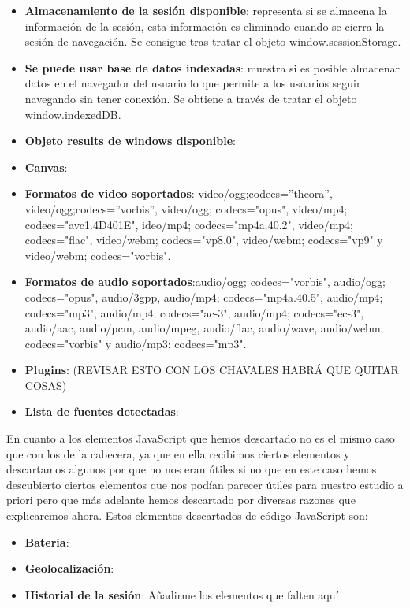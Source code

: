 \begin{itemize}
    \item \textbf{Almacenamiento de la sesión disponible}: representa si se almacena la información de la sesión, esta información es eliminado cuando se cierra la sesión de navegación. Se consigue tras tratar el objeto window.sessionStorage.
    \item \textbf{Se puede usar base de datos indexadas}: muestra si es posible almacenar datos en el navegador del usuario lo que permite a los usuarios seguir navegando sin tener conexión. Se obtiene a través de tratar el objeto window.indexedDB.
    \item \textbf{Objeto results de windows disponible}:
    \item \textbf{Canvas}:
    \item \textbf{Formatos de video soportados}:                                             video/ogg;codecs=”theora”, video/ogg;codecs=”vorbis”, video/ogg; codecs="opus", video/mp4; codecs="avc1.4D401E", ideo/mp4; codecs="mp4a.40.2", video/mp4; codecs="flac", video/webm; codecs="vp8.0", video/webm; codecs="vp9" y  video/webm; codecs="vorbis". 
    \item \textbf{Formatos de audio soportados}:audio/ogg; codecs="vorbis", audio/ogg; codecs="opus", audio/3gpp, audio/mp4; codecs="mp4a.40.5", audio/mp4; codecs="mp3", audio/mp4; codecs="ac-3", audio/mp4; codecs="ec-3", audio/aac, audio/pcm, audio/mpeg, audio/flac, audio/wave, audio/webm; codecs="vorbis" y audio/mp3; codecs="mp3".
    \item \textbf{Plugins}: (REVISAR ESTO CON LOS CHAVALES HABRÁ QUE QUITAR COSAS)
    \item \textbf{Lista de fuentes detectadas}: 
\end{itemize}
En cuanto a los elementos JavaScript que hemos descartado no es el mismo caso que con los de la cabecera, ya que en ella recibimos ciertos elementos y descartamos algunos por que no nos eran útiles si no que en este caso hemos descubierto ciertos elementos que nos podían parecer útiles para nuestro estudio a priori pero que más adelante hemos descartado por diversas razones que explicaremos ahora. Estos elementos descartados de código JavaScript son:
\begin{itemize}
    \item \textbf{Bateria}:
    \item \textbf{Geolocalización}:
    \item \textbf{Historial de la sesión}:
    Añadirme los elementos que falten aquí
\end{itemize}